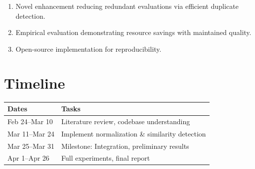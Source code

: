 \documentclass{article} %
\begin{document}
\begin{enumerate}\itemsep0pt
    \item Novel enhancement reducing redundant evaluations via efficient duplicate detection.
    \item Empirical evaluation demonstrating resource savings with maintained quality.
    \item Open-source implementation for reproducibility.
\end{enumerate}

\section{Timeline}

\vspace{-0.5em}
\begin{table}[h]
\centering\small
\begin{tabular}{ll}
\toprule
\textbf{Dates} & \textbf{Tasks} \\
\midrule
Feb 24--Mar 10 & Literature review, codebase understanding \\
Mar 11--Mar 24 & Implement normalization \& similarity detection \\
Mar 25--Mar 31 & Milestone: Integration, preliminary results \\
Apr 1--Apr 26 & Full experiments, final report \\
\bottomrule
\end{tabular}
\end{table}
\end{document}

